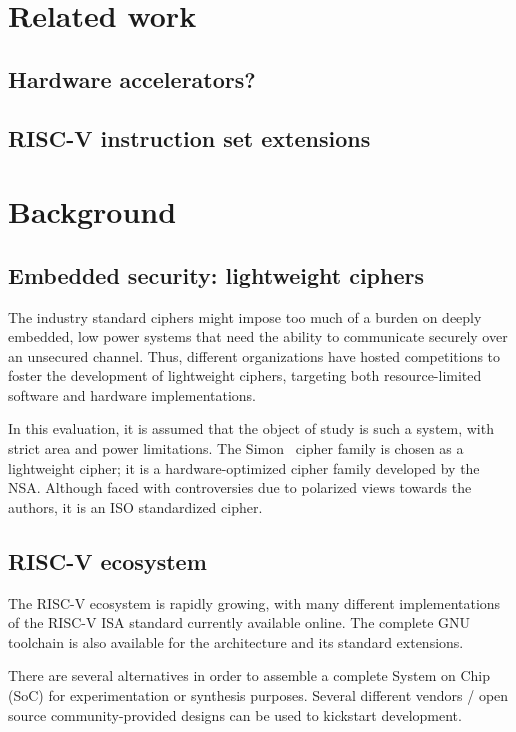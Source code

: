 \documentclass[10pt,conference]{IEEEtran}
\begin{document}
\section{Related work}

\subsection{Hardware accelerators?}

\subsection{RISC-V instruction set extensions}

\section{Background}


\subsection{Embedded security: lightweight ciphers}

The industry standard ciphers might impose too much of a burden on deeply
embedded, low power systems that need the ability to communicate securely over
an unsecured channel. Thus, different organizations have hosted competitions to
foster the development of lightweight ciphers, targeting both resource-limited
software and hardware implementations.

In this evaluation, it is assumed that the object of study is such a system,
with strict area and power limitations. The Simon~\cite{Beaulieu2015} cipher family is chosen as a
lightweight cipher; it is a hardware-optimized cipher family developed by the
NSA. Although faced with controversies due to polarized views towards the
authors, it is an ISO standardized cipher.

\subsection{RISC-V ecosystem}

The RISC-V ecosystem is rapidly growing, with many different implementations of
the RISC-V ISA standard currently available online. The complete GNU toolchain
is also available for the architecture and its standard extensions.

There are several alternatives in order to assemble a complete System on Chip
(SoC) for experimentation or synthesis purposes. Several different vendors /
open source community-provided designs can be used to kickstart development.
\end{document}
